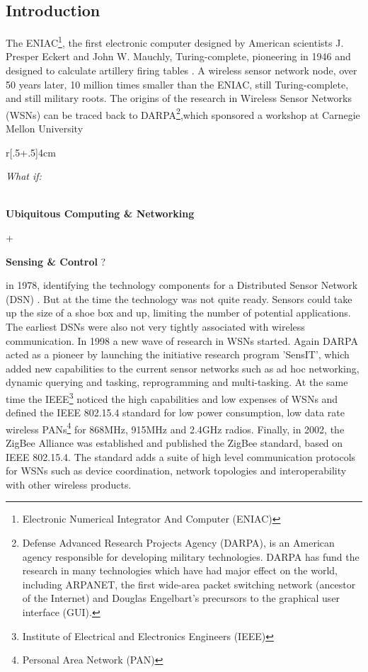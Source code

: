 \subsection{Introduction}
The ENIAC\footnote{Electronic Numerical Integrator And Computer (ENIAC)}, the first electronic computer designed by American scientists J. Presper Eckert and John W. Mauchly, Turing-complete,  pioneering in 1946 and designed to calculate artillery firing tables \citep{FLAMM}. A wireless sensor network node, over 50 years later, 10 million times smaller than the ENIAC, still Turing-complete, and still military roots. The origins of the research in Wireless Sensor Networks (WSNs) can be traced back to DARPA\footnote{Defense Advanced Research Projects Agency (DARPA), is an American agency responsible for developing military technologies. DARPA has fund the research in many technologies which have had major effect on the world, including ARPANET, the first wide-area packet switching network (ancestor of the Internet) and Douglas Engelbart's precursors to the graphical user interface (GUI)\citep{DARWIKI}.},which sponsored a workshop at Carnegie Mellon University\begin{wrapfigure}[9]{r}[\dimexpr.5\width+.5\columnsep\relax]{4cm}
  \centering
  \parbox{4cm}{\textsl{What if: }
\begin{large}
\textbf{\\Ubiquitous Computing \& Networking} \begin{center}+\end{center} \textbf{Sensing \& Control} ?
\end{large}}
\end{wrapfigure} in 1978, identifying the technology components for a Distributed Sensor Network (DSN) \citep{DAR}. But at the time the technology was not quite ready. Sensors could take up the size of a shoe box and up, limiting the number of potential applications. The earliest DSNs were also not very tightly associated with wireless communication. In 1998 a new wave of research in WSNs started. Again DARPA acted as a pioneer by launching the initiative research program 'SensIT', which added new capabilities to the current sensor networks such as ad hoc networking, dynamic querying and tasking, reprogramming and multi-tasking. At the same time the IEEE\footnote{Institute of Electrical and Electronics Engineers (IEEE)} noticed the high capabilities and low expenses of WSNs and defined the IEEE 802.15.4 standard for low power consumption, low data rate wireless PANs\footnote{Personal Area Network (PAN)} for 868MHz, 915MHz and 2.4GHz radios. Finally, in 2002, the ZigBee Alliance was established and published the ZigBee standard, based on IEEE 802.15.4. The standard adds a suite of high level communication protocols for WSNs such as device coordination, network topologies and interoperability with other wireless products.\\
